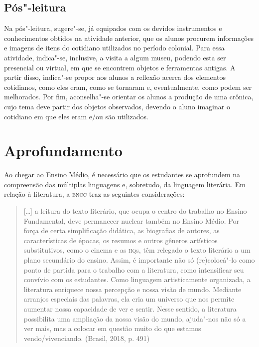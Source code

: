 \documentclass[12pt]{extarticle}
\begin{document}

\subsection{Pós"-leitura}

Na pós"-leitura, sugere"-se, já equipados com os devidos
instrumentos e conhecimentos obtidos na atividade anterior, que os
alunos procurem informações e imagens de itens do cotidiano utilizados
no período colonial. Para essa atividade, indica"-se, inclusive, a visita
a algum museu, podendo esta ser presencial ou virtual, em que se
encontrem objetos e ferramentas antigas. A partir disso, indica"-se
propor aos alunos a reflexão acerca dos elementos cotidianos, como eles
eram, como se tornaram e, eventualmente, como podem ser melhorados. Por
fim, aconselha"-se orientar os alunos a produção de uma crônica, cujo
tema deve partir dos objetos observados, devendo o aluno imaginar o
cotidiano em que eles eram e/ou são utilizados.

\section{Aprofundamento}

Ao chegar ao Ensino Médio, é necessário que os estudantes se aprofundem
na compreensão das múltiplas linguagens e, sobretudo, da linguagem
literária. Em relação à literatura, a \textsc{bncc} traz as seguintes
considerações:

\begin{quote}
{[}\ldots{}{]} a leitura do texto literário, que ocupa o centro do trabalho
no Ensino Fundamental, deve permanecer nuclear também no Ensino Médio.
Por força de certa simplificação didática, as biografias de autores, as
características de épocas, os resumos e outros gêneros artísticos
substitutivos, como o cinema e as \textsc{hq}s, têm relegado o texto literário a
um plano secundário do ensino. Assim, é importante não só (re)colocá"-lo
como ponto de partida para o trabalho com a literatura, como
intensificar seu convívio com os estudantes. Como linguagem
artisticamente organizada, a literatura enriquece nossa percepção e
nossa visão de mundo. Mediante arranjos especiais das palavras, ela cria
um universo que nos permite aumentar nossa capacidade de ver e sentir.
Nesse sentido, a literatura possibilita uma ampliação da nossa visão do
mundo, ajuda"-nos não só a ver mais, mas a colocar em questão muito do
que estamos vendo/vivenciando. (Brasil, 2018, p. 491)
\end{quote}
\end{document}
